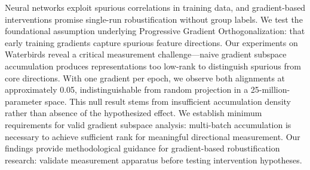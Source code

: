 Neural networks exploit spurious correlations in training data, and gradient-based interventions promise single-run robustification without group labels. We test the foundational assumption underlying Progressive Gradient Orthogonalization: that early training gradients capture spurious feature directions. Our experiments on Waterbirds reveal a critical measurement challenge---naive gradient subspace accumulation produces representations too low-rank to distinguish spurious from core directions. With one gradient per epoch, we observe both alignments at approximately 0.05, indistinguishable from random projection in a 25-million-parameter space. This null result stems from insufficient accumulation density rather than absence of the hypothesized effect. We establish minimum requirements for valid gradient subspace analysis: multi-batch accumulation is necessary to achieve sufficient rank for meaningful directional measurement. Our findings provide methodological guidance for gradient-based robustification research: validate measurement apparatus before testing intervention hypotheses.
